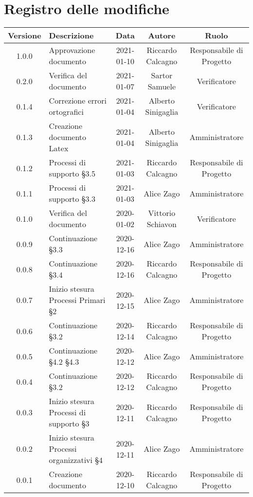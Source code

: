 \section*{Registro delle modifiche}

\begin{center}
	\begin{longtable}{|c|p{5cm}|c|c|c|}
	\hline
	\rowcolor{lighter-grayer}
	\textbf{Versione} & \textbf{Descrizione} & \textbf{Data} & \textbf{Autore} & \textbf{Ruolo} \\
	\hline
	\endfirsthead


	1.0.0 & Approvazione documento & 2021-01-10 & Riccardo Calcagno & Responsabile di Progetto \\
	\hline
	0.2.0 & Verifica del documento & 2021-01-07 & Sartor Samuele & Verificatore \\
	\hline
	0.1.4 & Correzione errori ortografici & 2021-01-04 & Alberto Sinigaglia & Verificatore \\
	\hline
	0.1.3 & Creazione documento Latex & 2021-01-04 & Alberto Sinigaglia & Amministratore \\
	\hline
	0.1.2 & Processi di supporto §3.5 & 2021-01-03 & Riccardo Calcagno & Responsabile di Progetto \\
	\hline
	0.1.1 & Processi di supporto §3.3 & 2021-01-03 & Alice Zago & Amministratore \\
	\hline
	0.1.0 & Verifica del documento & 2020-01-02 & Vittorio Schiavon & Verificatore \\
	\hline
	0.0.9 & Continuazione §3.3 & 2020-12-16 & Alice Zago & Amministratore \\
	\hline
	0.0.8 & Continuazione §3.4 & 2020-12-16 & Riccardo Calcagno & Responsabile di Progetto \\
	\hline
	0.0.7 & Inizio stesura Processi Primari §2 & 2020-12-15 & Alice Zago & Amministratore \\
	\hline
	0.0.6 & Continuazione §3.2 & 2020-12-14 & Riccardo Calcagno & Responsabile di Progetto\\
	\hline
	0.0.5 & Continuazione §4.2 §4.3 & 2020-12-12 & Alice Zago & Amministratore \\
	\hline
	0.0.4 & Continuazione §3.2 & 2020-12-12 & Riccardo Calcagno & Responsabile di Progetto \\
	\hline
	0.0.3 & Inizio stesura Processi di supporto §3 & 2020-12-11 & Riccardo Calcagno & Responsabile di Progetto \\
	\hline
	0.0.2 & Inizio stesura Processi organizzativi §4  & 2020-12-11 & Alice Zago & Amministratore \\
	\hline
	0.0.1 & Creazione documento & 2020-12-10 & Riccardo Calcagno & Responsabile di Progetto \\
	\hline

	\end{longtable}
\end{center}